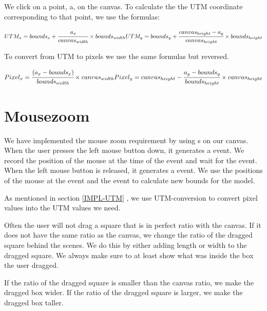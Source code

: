 We click on a point, a, on the canvas. To calculate the the UTM coordinate
corresponding to that point, we use the formulas:

$
UTM_x = bounds_x + \cfrac{a_x}{canvas_{width}} \times bounds_{width}\\
\\
UTM_y = bounds_y + \cfrac{canvas_{height} - a_y}{canvas_{height}} \times bounds_{height}\\
\\
$

To convert from UTM to pixels we use the same formulas but reversed.

$
\\
Pixel_x = \cfrac{(a_x - bounds_x)}{bounds_{width}} \times
canvas_{width}\\
\\
Pixel_y = canvas_{height} - \cfrac{a_y - bounds_y}{bounds_{height}} \times
canvas_{height}\\
\\
$

\section{Mousezoom}
\label{IMPL-MZ}
We have implemented the mouse zoom requirement by using s on
our canvas. When the user presses the left mouse button down, it generates a
 event. We record the position of the mouse at the time of
the  event and wait for the  event.
When the left mouse button is released, it generates a 
event. We use the positions of the mouse at the  event and
the  event to calculate new bounds for the model.

As mentioned in section \ref{IMPL-UTM} , we use
UTM-conversion to convert pixel values into the UTM values we need.

Often the user will not drag a square that is in perfect ratio with the
canvas. If it does not have the same ratio as the canvas, we change the ratio
of the dragged square behind the scenes. We do this by either adding length or
width to the dragged square. We always make sure to at least show what was
inside the box the user dragged.

If the ratio of the dragged square is smaller than the canvas ratio, we make the
dragged box wider. If the ratio of the dragged square is larger, we make the
dragged box taller.


